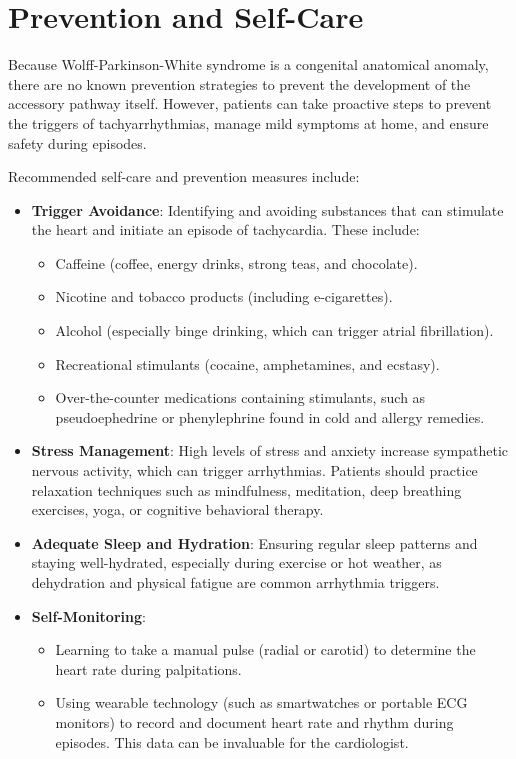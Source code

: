 \section*{Prevention and Self-Care}
Because Wolff-Parkinson-White syndrome is a congenital anatomical anomaly, there are no known prevention strategies to prevent the development of the accessory pathway itself. However, patients can take proactive steps to prevent the triggers of tachyarrhythmias, manage mild symptoms at home, and ensure safety during episodes.

Recommended self-care and prevention measures include:
\begin{itemize}
  \item \textbf{Trigger Avoidance}: Identifying and avoiding substances that can stimulate the heart and initiate an episode of tachycardia. These include:
    \begin{itemize}
      \item Caffeine (coffee, energy drinks, strong teas, and chocolate).
      \item Nicotine and tobacco products (including e-cigarettes).
      \item Alcohol (especially binge drinking, which can trigger atrial fibrillation).
      \item Recreational stimulants (cocaine, amphetamines, and ecstasy).
      \item Over-the-counter medications containing stimulants, such as pseudoephedrine or phenylephrine found in cold and allergy remedies.
    \end{itemize}
  \item \textbf{Stress Management}: High levels of stress and anxiety increase sympathetic nervous activity, which can trigger arrhythmias. Patients should practice relaxation techniques such as mindfulness, meditation, deep breathing exercises, yoga, or cognitive behavioral therapy.
  \item \textbf{Adequate Sleep and Hydration}: Ensuring regular sleep patterns and staying well-hydrated, especially during exercise or hot weather, as dehydration and physical fatigue are common arrhythmia triggers.
  \item \textbf{Self-Monitoring}:
    \begin{itemize}
      \item Learning to take a manual pulse (radial or carotid) to determine the heart rate during palpitations.
      \item Using wearable technology (such as smartwatches or portable ECG monitors) to record and document heart rate and rhythm during episodes. This data can be invaluable for the cardiologist.

\end{itemize}
\end{itemize}
